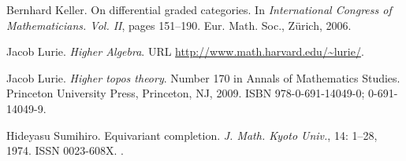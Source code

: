 \documentclass{oupau}
\theoremstyle{remark}
\begin{document}
\begin{thebibliography}{20}
Bernhard Keller.
\newblock On differential graded categories.
\newblock In \emph{International {C}ongress of {M}athematicians. {V}ol. {II}},
  pages 151--190. Eur. Math. Soc., Zürich, 2006.

Jacob Lurie.
\newblock \emph{Higher Algebra}.
\newblock URL \url{http://www.math.harvard.edu/~lurie/}.

Jacob Lurie.
\newblock \emph{Higher topos theory}.
\newblock Number 170 in Annals of Mathematics Studies. Princeton University
  Press, Princeton, NJ, 2009.
\newblock ISBN 978-0-691-14049-0; 0-691-14049-9.

Hideyasu Sumihiro.
\newblock Equivariant completion.
\newblock \emph{J. Math. Kyoto Univ.}, 14:
  1--28, 1974.
\newblock ISSN 0023-608X.
\newblock {}.

\end{thebibliography}
\end{document}
